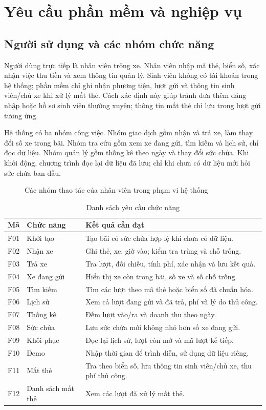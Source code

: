 \chapter{Yêu cầu phần mềm và nghiệp vụ}
\label{chap:requirements}

\section{Người sử dụng và các nhóm chức năng}
Người dùng trực tiếp là nhân viên trông xe. Nhân viên nhập mã thẻ, biển số, xác nhận việc thu tiền và xem thông tin quản lý. Sinh viên không có tài khoản trong hệ thống; phần mềm chỉ ghi nhận phương tiện, lượt gửi và thông tin sinh viên/chủ xe khi xử lý mất thẻ. Cách xác định này giúp tránh đưa thêm đăng nhập hoặc hồ sơ sinh viên thường xuyên; thông tin mất thẻ chỉ lưu trong lượt gửi tương ứng.

Hệ thống có ba nhóm công việc. Nhóm giao dịch gồm nhận và trả xe, làm thay đổi số xe trong bãi. Nhóm tra cứu gồm xem xe đang gửi, tìm kiếm và lịch sử, chỉ đọc dữ liệu. Nhóm quản lý gồm thống kê theo ngày và thay đổi sức chứa. Khi khởi động, chương trình đọc lại dữ liệu đã lưu; chỉ khi chưa có dữ liệu mới hỏi sức chứa ban đầu.

\begin{figure}[H]
\centering

\caption{Các nhóm thao tác của nhân viên trong phạm vi hệ thống}
\label{fig:use-cases}
\end{figure}

\begin{table}[H]
\centering\small
\caption{Danh sách yêu cầu chức năng}
\label{tab:functions}
\begin{tabularx}{\textwidth}{l l Y}
\toprule
Mã & Chức năng & Kết quả cần đạt\\
\midrule
F01 & Khởi tạo & Tạo bãi có sức chứa hợp lệ khi chưa có dữ liệu.\\
F02 & Nhận xe & Ghi thẻ, xe, giờ vào; kiểm tra trùng và chỗ trống.\\
F03 & Trả xe & Tra lượt, đối chiếu, tính phí, xác nhận và lưu kết quả.\\
F04 & Xe đang gửi & Hiển thị xe còn trong bãi, số xe và số chỗ trống.\\
F05 & Tìm kiếm & Tìm các lượt theo mã thẻ hoặc biển số đã chuẩn hóa.\\
F06 & Lịch sử & Xem cả lượt đang gửi và đã trả, phí và lý do thủ công.\\
F07 & Thống kê & Đếm lượt vào/ra và doanh thu theo ngày.\\
F08 & Sức chứa & Lưu sức chứa mới không nhỏ hơn số xe đang gửi.\\
F09 & Khôi phục & Đọc lại lịch sử, lượt còn mở và mã lượt kế tiếp.\\
F10 & Demo & Nhập thời gian để trình diễn, sử dụng dữ liệu riêng.\\
F11 & Mất thẻ & Tra theo biển số, lưu thông tin sinh viên/chủ xe, thu phí thủ công.\\
F12 & Danh sách mất thẻ & Xem các lượt đã xử lý mất thẻ.\\
\bottomrule
\end{tabularx}
\end{table}

